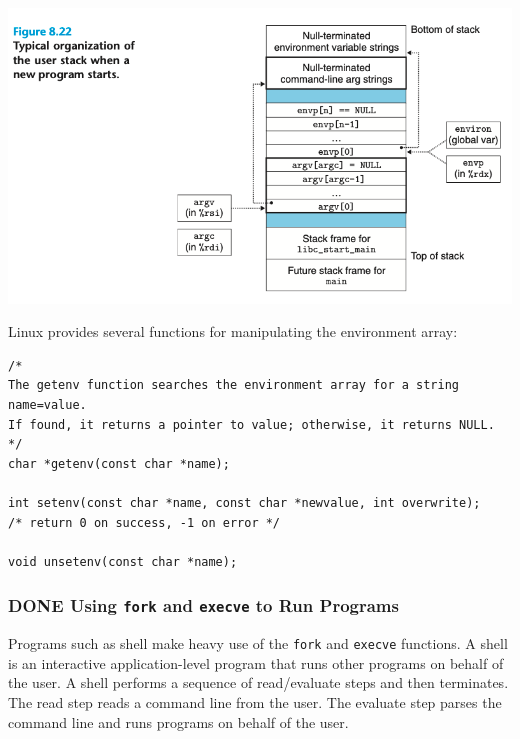 \documentclass[11pt]{article}
\begin{document}
\begin{center}
\includegraphics[width=.9\linewidth]{pics/figure8.22-typical-organization-of-the-user-stack-when-a-new-program-starts.png}
\end{center}


Linux provides several functions for manipulating the environment array:\\
\begin{verbatim}
/*
The getenv function searches the environment array for a string name=value. 
If found, it returns a pointer to value; otherwise, it returns NULL.
*/
char *getenv(const char *name);

int setenv(const char *name, const char *newvalue, int overwrite);
/* return 0 on success, -1 on error */

void unsetenv(const char *name);
\end{verbatim}

\subsubsection{{\bfseries\sffamily DONE} Using \texttt{fork} and \texttt{execve} to Run Programs}
\label{sec:org7726b86}
Programs such as shell make heavy use of the \texttt{fork} and \texttt{execve} functions. A shell is an interactive application-level program that runs other programs on behalf of the user. A shell performs a sequence of read/evaluate steps and then terminates. The read step reads a command line from the user. The evaluate step parses the command line and runs programs on behalf of the user.\\
\end{document}
